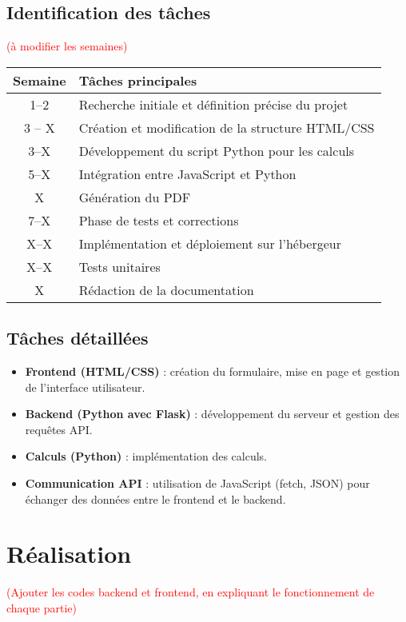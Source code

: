 \documentclass{article}
\begin{document}
	\subsection{Identification des tâches}\textcolor{red}{(à modifier les semaines)}
	
	\begin{tabular}{|c|p{10cm}|}
		\hline
		\textbf{Semaine} & \textbf{Tâches principales} \\
		\hline
		1--2 & Recherche initiale et définition précise du projet \\
		3 -- X & Création et modification de la structure HTML/CSS \\
		3--X & Développement du script Python pour les calculs \\
		5--X & Intégration entre JavaScript et Python \\
		X & Génération du PDF \\
		7--X & Phase de tests et corrections \\
		X--X & Implémentation et déploiement sur l’hébergeur \\
		X--X & Tests unitaires \\
		X & Rédaction de la documentation \\
		\hline
	\end{tabular}

	
	\subsection*{Tâches détaillées}
	
	\begin{itemize}
		\item \textbf{Frontend (HTML/CSS)} : création du formulaire, mise en page et gestion de l’interface utilisateur.
		\item \textbf{Backend (Python avec Flask)} : développement du serveur et gestion des requêtes API.
		\item \textbf{Calculs (Python)} : implémentation des calculs.
		\item \textbf{Communication API} : utilisation de JavaScript (fetch, JSON) pour échanger des données entre le frontend et le backend.
	\end{itemize}

	
	\section{Réalisation}
	\textcolor{red}{(Ajouter les codes backend et frontend, en expliquant le fonctionnement de chaque partie)}
	
\end{document}
